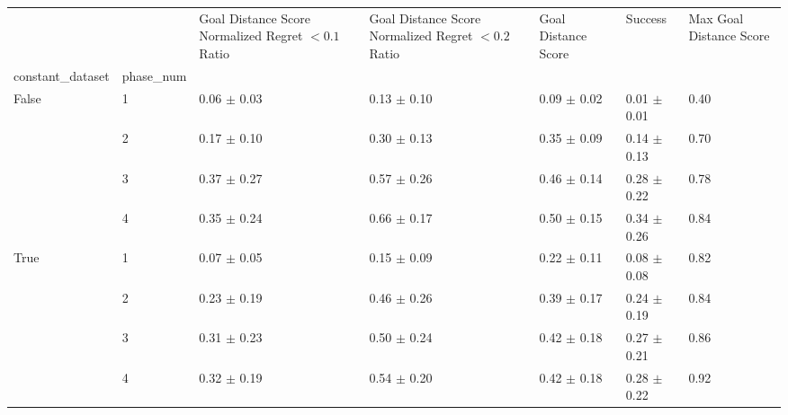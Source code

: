 \begin{tabular}{lllllll}
\toprule
 &  & Goal Distance Score Normalized Regret $< 0.1$ Ratio & Goal Distance Score Normalized Regret $< 0.2$ Ratio & Goal Distance Score & Success & Max Goal Distance Score \\
constant_dataset & phase_num &  &  &  &  &  \\
\midrule
\multirow[t]{4}{*}{False} & 1 & 0.06 $\pm$ 0.03 & 0.13 $\pm$ 0.10 & 0.09 $\pm$ 0.02 & 0.01 $\pm$ 0.01 & 0.40 \\
 & 2 & 0.17 $\pm$ 0.10 & 0.30 $\pm$ 0.13 & 0.35 $\pm$ 0.09 & 0.14 $\pm$ 0.13 & 0.70 \\
 & 3 & 0.37 $\pm$ 0.27 & 0.57 $\pm$ 0.26 & 0.46 $\pm$ 0.14 & 0.28 $\pm$ 0.22 & 0.78 \\
 & 4 & 0.35 $\pm$ 0.24 & 0.66 $\pm$ 0.17 & 0.50 $\pm$ 0.15 & 0.34 $\pm$ 0.26 & 0.84 \\
\cline{1-7}
\multirow[t]{4}{*}{True} & 1 & 0.07 $\pm$ 0.05 & 0.15 $\pm$ 0.09 & 0.22 $\pm$ 0.11 & 0.08 $\pm$ 0.08 & 0.82 \\
 & 2 & 0.23 $\pm$ 0.19 & 0.46 $\pm$ 0.26 & 0.39 $\pm$ 0.17 & 0.24 $\pm$ 0.19 & 0.84 \\
 & 3 & 0.31 $\pm$ 0.23 & 0.50 $\pm$ 0.24 & 0.42 $\pm$ 0.18 & 0.27 $\pm$ 0.21 & 0.86 \\
 & 4 & 0.32 $\pm$ 0.19 & 0.54 $\pm$ 0.20 & 0.42 $\pm$ 0.18 & 0.28 $\pm$ 0.22 & 0.92 \\
\cline{1-7}
\bottomrule
\end{tabular}
